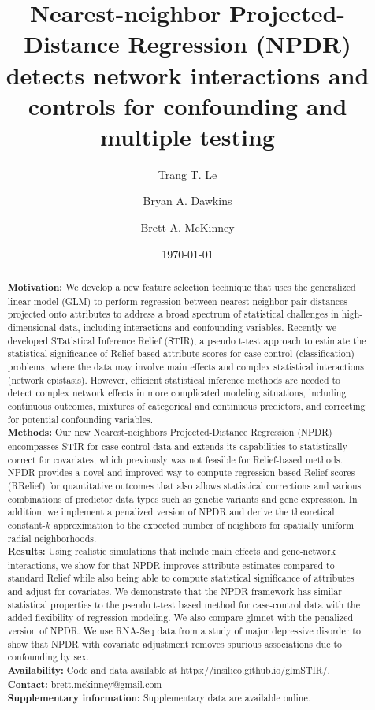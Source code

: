 \documentclass[10pt]{article}
\title{Nearest-neighbor Projected-Distance Regression (NPDR) detects network interactions and controls for confounding and multiple testing}
\author[1]{Trang T. Le}
\author[2]{Bryan A. Dawkins}
\author[2,3*]{Brett A. McKinney}
\affil[1]{Department of Biostatistics, Epidemiology and Informatics,
University of Pennsylvania, Philadelphia, PA 19104}
\affil[2]{Department of Mathematics, University of Tulsa, Tulsa, OK 74104}
\affil[3]{Tandy School of Computer Science, University of Tulsa, Tulsa, OK 74104}
\date{\today}
\begin{document}

\maketitle
\begin{abstract}
        
{\bf Motivation:} We develop a new feature selection technique that uses the generalized linear model (GLM) to perform regression between nearest-neighbor pair distances projected onto attributes to address a broad spectrum of statistical challenges in high-dimensional data, including interactions and confounding variables. Recently we developed STatistical Inference Relief (STIR), a pseudo t-test approach to estimate the statistical significance of Relief-based attribute scores for case-control (classification) problems, where the data may involve main effects and complex statistical interactions (network epistasis). However, efficient statistical inference methods are needed to detect complex network effects in more complicated modeling situations, including continuous outcomes, mixtures of categorical and continuous predictors, and correcting for potential confounding variables. 
\\
{\bf Methods:} Our new Nearest-neighbors Projected-Distance Regression (NPDR) encompasses STIR for case-control data and extends its capabilities to statistically correct for covariates, which previously was not feasible for Relief-based methods. NPDR provides a novel and improved way to compute regression-based Relief scores (RRelief) for quantitative outcomes that also allows statistical corrections and various combinations of predictor data types such as genetic variants and gene expression. In addition, we implement a penalized version of NPDR and derive the theoretical constant-$k$ approximation to the expected number of neighbors for spatially uniform radial neighborhoods. 
\\
{\bf Results:} Using realistic simulations that include main effects and gene-network interactions, we show for that NPDR improves attribute estimates compared to standard Relief while also being able to compute statistical significance of attributes and adjust for covariates.  We demonstrate that the NPDR framework has similar statistical properties to the pseudo t-test based method for case-control data with the added flexibility of regression modeling. We also compare glmnet with the penalized version of NPDR. We use RNA-Seq data from a study of major depressive disorder to show that NPDR with covariate adjustment removes spurious associations due to confounding by sex. 
\\
\textbf{Availability:} Code and data available at {{https://insilico.github.io/glmSTIR/}}.\\
\textbf{Contact:} {{brett.mckinney@gmail.com}}\\
\textbf{Supplementary information:} Supplementary data are available online.

\end{abstract}
\end{document}
